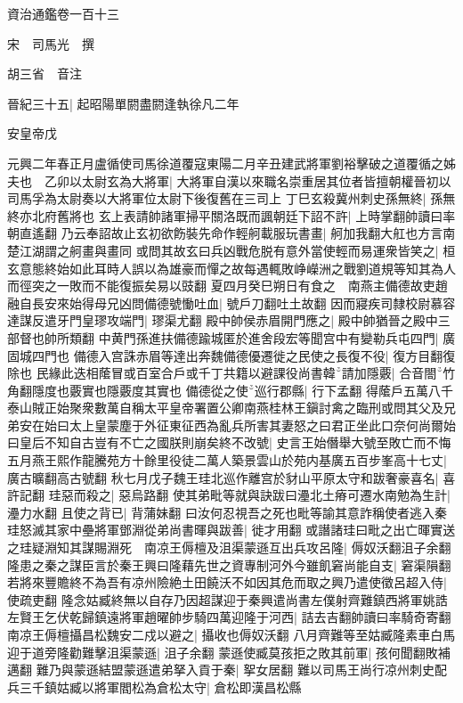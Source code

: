 資治通鑑卷一百十三

宋　司馬光　撰

胡三省　音注

晉紀三十五|{
	起昭陽單閼盡閼逢執徐凡二年}


安皇帝戊

元興二年春正月盧循使司馬徐道覆寇東陽二月辛丑建武將軍劉裕擊破之道覆循之姊夫也　乙卯以太尉玄為大將軍|{
	大將軍自漢以來職名崇重居其位者皆擅朝權晉初以司馬孚為太尉奏以大將軍位太尉下後復舊在三司上}
丁巳玄殺冀州刺史孫無終|{
	孫無終亦北府舊將也}
玄上表請帥諸軍掃平關洛既而諷朝廷下詔不許|{
	上時掌翻帥讀曰率朝直遙翻}
乃云奉詔故止玄初欲飭裝先命作輕舸載服玩書畫|{
	舸加我翻大舡也方言南楚江湖謂之舸畫與畫同}
或問其故玄曰兵凶戰危脱有意外當使輕而易運衆皆笑之|{
	桓玄意態終始如此耳時人誤以為雄豪而憚之故每遇輒敗峥嶸洲之戰劉道規等知其為人而徑突之一敗而不能復振矣易以豉翻}
夏四月癸巳朔日有食之　南燕主備德故吏趙融自長安來始得母兄凶問備德號慟吐血|{
	號戶刀翻吐土故翻}
因而寢疾司隸校尉慕容達謀反遣牙門皇璆攻端門|{
	璆渠尤翻}
殿中帥侯赤眉開門應之|{
	殿中帥猶晉之殿中三部督也帥所類翻}
中黄門孫進扶備德踰城匿於進舍段宏等聞宫中有變勒兵屯四門|{
	廣固城四門也}
備德入宫誅赤眉等達出奔魏備德優遷徙之民使之長復不役|{
	復方目翻復除也}
民緣此迭相䕃冒或百室合戶或千丁共籍以避課役尚書韓請加隱覈|{
	合音閤竹角翻隱度也覈實也隱覈度其實也}
備德從之使巡行郡縣|{
	行下孟翻}
得䕃戶五萬八千　泰山賊正始聚衆數萬自稱太平皇帝署置公卿南燕桂林王鎭討禽之臨刑或問其父及兄弟安在始曰太上皇蒙塵于外征東征西為亂兵所害其妻怒之曰君正坐此口奈何尚爾始曰皇后不知自古豈有不亡之國朕則崩矣終不改號|{
	史言王始僭舉大號至敗亡而不悔}
五月燕王熙作龍騰苑方十餘里役徒二萬人築景雲山於苑内基廣五百步峯高十七丈|{
	廣古曠翻高古號翻}
秋七月戊子魏王珪北巡作離宫於豺山平原太守和跋奢豪喜名|{
	喜許記翻}
珪惡而殺之|{
	惡烏路翻}
使其弟毗等就與訣跋曰灅北土瘠可遷水南勉為生計|{
	灅力水翻}
且使之背已|{
	背蒲妹翻}
曰汝何忍視吾之死也毗等諭其意詐稱使者逃入秦珪怒滅其家中壘將軍鄧淵從弟尚書暉與跋善|{
	徙才用翻}
或譖諸珪曰毗之出亡暉實送之珪疑淵知其謀賜淵死　南凉王傉檀及沮渠蒙遜互出兵攻呂隆|{
	傉奴沃翻沮子余翻}
隆患之秦之謀臣言於秦王興曰隆藉先世之資專制河外今雖飢窘尚能自支|{
	窘渠隕翻}
若將來豐贍終不為吾有凉州險絶土田饒沃不如因其危而取之興乃遣使徵呂超入侍|{
	使疏吏翻}
隆念姑臧終無以自存乃因超謀迎于秦興遣尚書左僕射齊難鎮西將軍姚誥左賢王乞伏乾歸鎮遠將軍趙曜帥步騎四萬迎隆于河西|{
	詰去吉翻帥讀曰率騎奇寄翻}
南凉王傉檀攝昌松魏安二戍以避之|{
	攝收也傉奴沃翻}
八月齊難等至姑臧隆素車白馬迎于道旁隆勸難擊沮渠蒙遜|{
	沮子余翻}
蒙遜使臧莫孩拒之敗其前軍|{
	孩何聞翻敗補邁翻}
難乃與蒙遜結盟蒙遜遣弟拏入貢于秦|{
	挐女居翻}
難以司馬王尚行凉州刺史配兵三千鎮姑臧以將軍閻松為倉松太守|{
	倉松即漢昌松縣}

